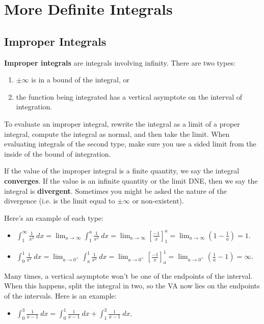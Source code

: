 \section{More Definite Integrals}

\subsection{Improper Integrals}

\textbf{Improper integrals} are integrals involving infinity. There are two types:
\begin{enumerate}
    \item $\pm\infty$ is in a bound of the integral, or
    \item the function being integrated has a vertical asymptote on the interval of integration.
\end{enumerate}


To evaluate an improper integral, rewrite the integral as a limit of a proper integral, compute the integral as normal, and then take the limit. When evaluating integrals of the second type, make sure you use a sided limit from the inside of the bound of integration.

If the value of the improper integral is a finite quantity, we say the integral \textbf{converges}. If the value is an infinite quantity or the limit DNE, then we say the integral is \textbf{divergent}. Sometimes you might be asked the nature of the divergence (i.e. is the limit equal to $\pm\infty$ or non-existent).

Here's an example of each type:

\begin{itemize}%
    \item $\displaystyle \int_1^\infty \frac{1}{x^2}\ dx
     = \lim_{a\to \infty}\int_1^a \frac{1}{x^2}\ dx 
     = \lim_{a\to \infty}\left[\frac{-1}{x}\right]_1^a 
     = \lim_{a\to \infty} \left(1-\frac{1}{a}\right)
    =1.$
    \item $\displaystyle\int_{0}^{1}\frac{1}{x^{2}}\ dx 
     = \lim_{a\to 0^+} \int_{a}^{1}\frac{1}{x^{2}}\ dx 
     = \lim_{a\to 0^+}\left[\frac{-1}{x}\right]_a^1 
     = \lim_{a\to 0^+}\left(\frac{1}{a}-1\right)
     = \infty.$
\end{itemize}


Many times, a vertical asymptote won't be one of the endpoints of the interval. When this happens, split the integral in two, so the VA now lies on the endpoints of the intervals. Here is an example:
\begin{itemize}
	\item $\displaystyle \int_0^3 \frac{1}{x-1} \ dx = \int_0^1 \frac{1}{x-1} \ dx + \int_1^3 \frac{1}{x-1} \ dx$.
\end{itemize}



